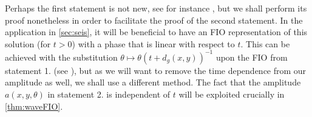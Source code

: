 \documentclass[
	fontsize=11pt, 
	twoside=false, 
	abstract=true, 
	a4paper,
]{scrartcl}
\newcommand{\RR}{\mathbb{R}}
\newcommand{\del}{\partial}
\newcommand{\an}{\quad\text{and}\quad}
\begin{document}
Perhaps the first statement is not new, see for instance \cite[\S~6.1]{zbMATH06828045}, but we shall perform its proof nonetheless in order to facilitate the proof of the second statement. In the application in \cref{sec:seis}, it will be beneficial to have an FIO representation of this solution (for $t>0$) with a phase that is linear with respect to $t$. This can be achieved with the substitution $\theta \mapsto \theta(t+d_g(x,y))^{-1}$ upon the FIO from statement 1. (see \cite[Eq.~(5.14)]{zbMATH06469358}), but as we will want to remove the time dependence from our amplitude as well, we shall use a different method. The fact that the amplitude $a(x,y,\theta)$ in statement 2. is independent of $t$ will be exploited crucially in \cref{thm:waveFIO}.

%
%
\end{document}
